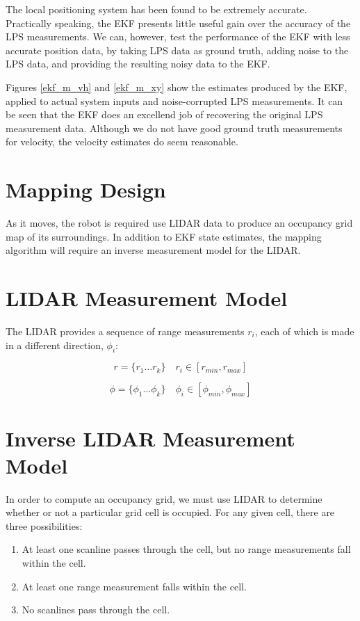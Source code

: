 \documentclass[11pt]{article} %
\begin{document}
The local positioning system has been found to be extremely accurate.  Practically speaking, the EKF presents little useful gain over the accuracy of the LPS measurements.  We can, however, test the performance of the EKF with less accurate position data, by taking LPS data as ground truth, adding noise to the LPS data, and providing the resulting noisy data to the EKF.

Figures \ref{ekf_m_vh} and \ref{ekf_m_xy} show the estimates produced by the EKF, applied to actual system inputs and noise-corrupted LPS measurements.  It can be seen that the EKF does an excellend job of recovering the original LPS measurement data.  Although we do not have good ground truth measurements for velocity, the velocity estimates do seem reasonable.

\clearpage

\section{Mapping Design}
As it moves, the robot is required use LIDAR data to produce an occupancy grid map of its surroundings.  In addition to EKF state estimates, the mapping algorithm will require an inverse measurement model for the LIDAR.

\section{LIDAR Measurement Model}
The LIDAR provides a sequence of range measurements $r_i$, each of which is made in a different direction, $\phi_i$:

\begin{equation}
r = \{r_1 \dots r_k\} \quad r_i \in [r_{min}, r_{max}]
\end{equation}

\begin{equation}
\phi = \{\phi_1 \dots \phi_k\} \quad \phi_i \in [\phi_{min}, \phi_{max}]
\end{equation}

\section{Inverse LIDAR Measurement Model}
In order to compute an occupancy grid, we must use LIDAR to determine whether or not a particular grid cell is occupied.  For any given cell, there are three possibilities:

\begin{enumerate}
 \item At least one scanline passes through the cell, but no range measurements fall within the cell.
 \item At least one range measurement falls within the cell.
 \item No scanlines pass through the cell.
\end{enumerate}
\end{document}
